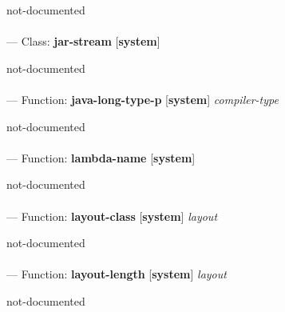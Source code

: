 \begin{adjustwidth}{5em}{5em}
not-documented
\end{adjustwidth}

\paragraph{}
\label{SYSTEM:JAR-STREAM}
--- Class: \textbf{jar-stream} [\textbf{system}] \textit{}

\begin{adjustwidth}{5em}{5em}
not-documented
\end{adjustwidth}

\paragraph{}
\label{SYSTEM:JAVA-LONG-TYPE-P}
--- Function: \textbf{java-long-type-p} [\textbf{system}] \textit{compiler-type}

\begin{adjustwidth}{5em}{5em}
not-documented
\end{adjustwidth}

\paragraph{}
\label{SYSTEM:LAMBDA-NAME}
--- Function: \textbf{lambda-name} [\textbf{system}] \textit{}

\begin{adjustwidth}{5em}{5em}
not-documented
\end{adjustwidth}

\paragraph{}
\label{SYSTEM:LAYOUT-CLASS}
--- Function: \textbf{layout-class} [\textbf{system}] \textit{layout}

\begin{adjustwidth}{5em}{5em}
not-documented
\end{adjustwidth}

\paragraph{}
\label{SYSTEM:LAYOUT-LENGTH}
--- Function: \textbf{layout-length} [\textbf{system}] \textit{layout}

\begin{adjustwidth}{5em}{5em}
not-documented
\end{adjustwidth}

